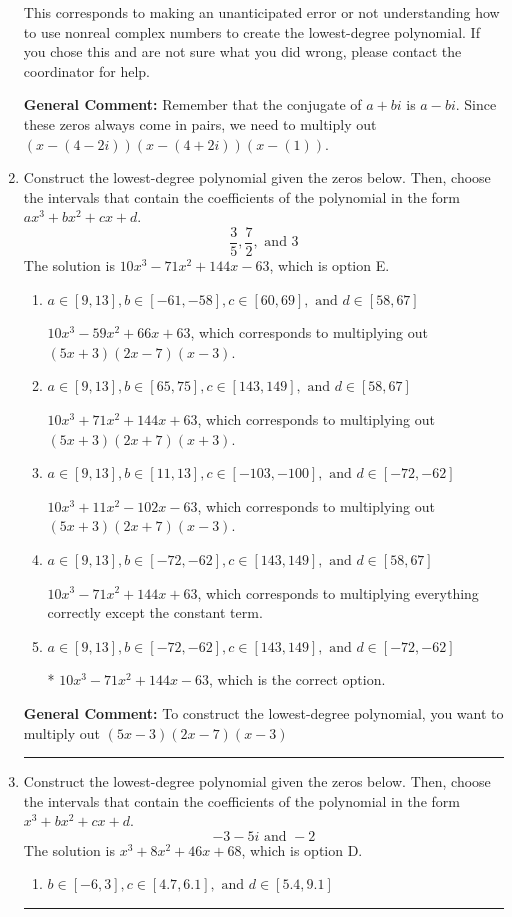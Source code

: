 \documentclass{extbook}[14pt]
\newcommand{\litem}[1]{\item #1

\rule{\textwidth}{0.4pt}}
\begin{document}
\begin{enumerate}
{\begin{enumerate}[label=\Alph*.]
This corresponds to making an unanticipated error or not understanding how to use nonreal complex numbers to create the lowest-degree polynomial. If you chose this and are not sure what you did wrong, please contact the coordinator for help.
\end{enumerate}

\textbf{General Comment:} Remember that the conjugate of $a+bi$ is $a-bi$. Since these zeros always come in pairs, we need to multiply out $(x-(4 - 2 i))(x-(4 + 2 i))(x-(1))$.
}
\litem{
Construct the lowest-degree polynomial given the zeros below. Then, choose the intervals that contain the coefficients of the polynomial in the form $ax^3+bx^2+cx+d$.
\[ \frac{3}{5}, \frac{7}{2}, \text{ and } 3 \]The solution is \( 10x^{3} -71 x^{2} +144 x -63 \), which is option E.\begin{enumerate}[label=\Alph*.]
\item \( a \in [9, 13], b \in [-61, -58], c \in [60, 69], \text{ and } d \in [58, 67] \)

$10x^{3} -59 x^{2} +66 x + 63$, which corresponds to multiplying out $(5x + 3)(2x -7)(x -3)$.
\item \( a \in [9, 13], b \in [65, 75], c \in [143, 149], \text{ and } d \in [58, 67] \)

$10x^{3} +71 x^{2} +144 x + 63$, which corresponds to multiplying out $(5x + 3)(2x + 7)(x + 3)$.
\item \( a \in [9, 13], b \in [11, 13], c \in [-103, -100], \text{ and } d \in [-72, -62] \)

$10x^{3} +11 x^{2} -102 x -63$, which corresponds to multiplying out $(5x + 3)(2x + 7)(x -3)$.
\item \( a \in [9, 13], b \in [-72, -62], c \in [143, 149], \text{ and } d \in [58, 67] \)

$10x^{3} -71 x^{2} +144 x + 63$, which corresponds to multiplying everything correctly except the constant term.
\item \( a \in [9, 13], b \in [-72, -62], c \in [143, 149], \text{ and } d \in [-72, -62] \)

* $10x^{3} -71 x^{2} +144 x -63$, which is the correct option.
\end{enumerate}

\textbf{General Comment:} To construct the lowest-degree polynomial, you want to multiply out $(5x -3)(2x -7)(x -3)$
}
\litem{
Construct the lowest-degree polynomial given the zeros below. Then, choose the intervals that contain the coefficients of the polynomial in the form $x^3+bx^2+cx+d$.
\[ -3 - 5 i \text{ and } -2 \]The solution is \( x^{3} +8 x^{2} +46 x + 68 \), which is option D.\begin{enumerate}[label=\Alph*.]
\item \( b \in [-6, 3], c \in [4.7, 6.1], \text{ and } d \in [5.4, 9.1] \)


\end{enumerate}}
\end{enumerate}
\end{document}

